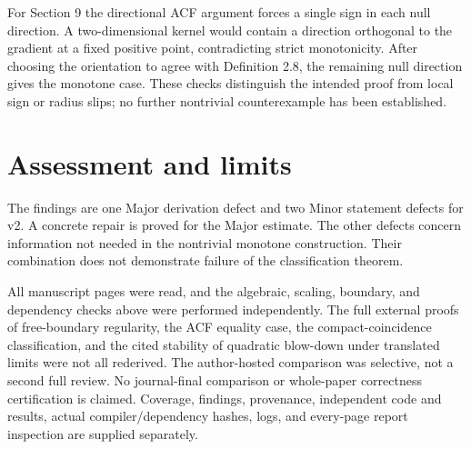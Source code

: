 \documentclass[10pt]{article}
\begin{document}
For Section 9 the directional ACF argument forces a single sign in each null direction. A two-dimensional kernel would contain a direction orthogonal to the gradient at a fixed positive point, contradicting strict monotonicity. After choosing the orientation to agree with Definition 2.8, the remaining null direction gives the monotone case. These checks distinguish the intended proof from local sign or radius slips; no further nontrivial counterexample has been established.\par
\section*{Assessment and limits}
The findings are one Major derivation defect and two Minor statement defects for v2. A concrete repair is proved for the Major estimate. The other defects concern information not needed in the nontrivial monotone construction. Their combination does not demonstrate failure of the classification theorem.\par
All manuscript pages were read, and the algebraic, scaling, boundary, and dependency checks above were performed independently. The full external proofs of free-boundary regularity, the ACF equality case, the compact-coincidence classification, and the cited stability of quadratic blow-down under translated limits were not all rederived. The author-hosted comparison was selective, not a second full review. No journal-final comparison or whole-paper correctness certification is claimed. Coverage, findings, provenance, independent code and results, actual compiler/dependency hashes, logs, and every-page report inspection are supplied separately.\par
\end{document}
